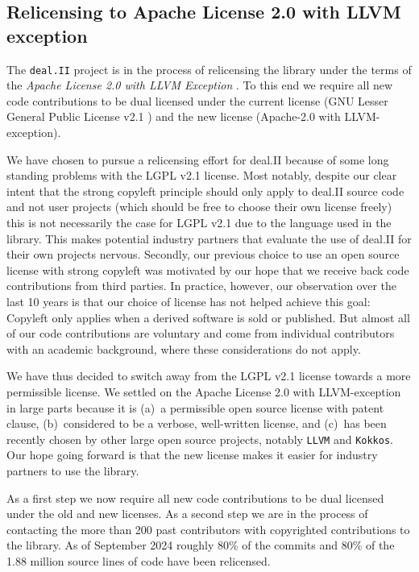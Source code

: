 \documentclass{ansarticle-preprint}
\newcommand{\specialword}[1]{\texttt{#1}}
\newcommand{\dealii}{{\specialword{deal.II}}\xspace}
\newcommand{\kokkos}{{\specialword{Kokkos}}\xspace}
\newcommand{\llvm}{{\specialword{LLVM}}\xspace}
\begin{document}
\subsection{Relicensing to Apache License 2.0 with LLVM exception}
\label{sec:license}

The \dealii project is in the process of relicensing the library under the
terms of the \emph{Apache License 2.0 with LLVM
Exception} \cite{Apache-2.0,LLVM-Exception}. To this end we require all new
code contributions to be dual licensed under the current license (GNU
Lesser General Public License v2.1 \cite{LGPL-2.1}) and the new license
(Apache-2.0 with LLVM-exception).

We have chosen to pursue a relicensing effort for deal.II because of some
long standing problems with the LGPL v2.1 license. Most notably, despite
our clear intent that the strong copyleft principle should only apply to
deal.II source code and not user projects (which should be free to choose
their own license freely) this is not necessarily the case for LGPL v2.1
due to the language used in the library. This makes potential industry
partners that evaluate the use of deal.II for their own projects nervous.
Secondly, our previous choice to use an open source license with strong
copyleft was motivated by our hope that we receive back code contributions
from third parties. In practice, however, our observation over the
last 10 years is that
our choice of license has not helped achieve this goal: Copyleft only applies when a derived
software is sold or published. But almost all of our code contributions are
voluntary and come from individual contributors with an academic
background, where these considerations do not apply.

We have thus decided to switch away from the LGPL v2.1 license towards a
more permissible license. We settled on the Apache License 2.0 with
LLVM-exception in large parts because it is (a)~a permissible open source
license with patent clause, (b)~considered to be a verbose, well-written
license, and (c)~has been recently chosen by other large open source
projects, notably \llvm{} and \kokkos{}. Our hope going forward is
that the new license makes it easier for industry partners to use the library.

As a first step we now require all new code contributions to be dual
licensed under the old and new licenses. As a second step we are in the
process of contacting the more than 200 past contributors with copyrighted
contributions to the library. As of September 2024 roughly 80\% of the
commits and 80\% of the 1.88 million source lines of code have been
relicensed.
\end{document}
